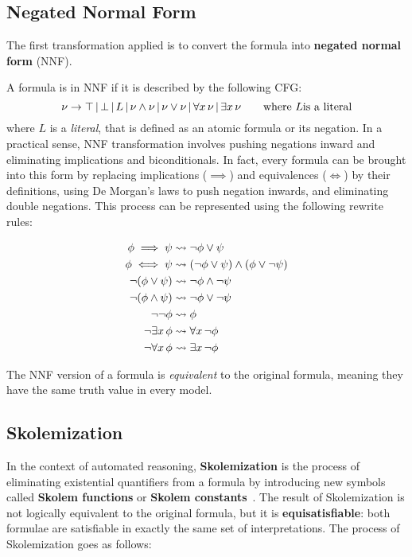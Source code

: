 \subsection{Negated Normal Form}
The first transformation applied is to convert the formula into \textbf{negated normal form} (NNF).

A formula is in NNF if it is described by the following CFG\@:
\begin{equation}
  \nu \to \top  \, | \,  \bot  \, | \,  L  \, | \,  \nu \land \nu  \, | \,  \nu \lor \nu  \, | \,  \forall x  \,  \nu  \, | \,  \exists x  \,  \nu \quad\quad \text{where } L \text{is a literal}
\end{equation}
where \(L\) is a \textit{literal}, that is defined as an atomic formula or its negation.
In a practical sense, NNF transformation involves pushing negations inward and eliminating implications and biconditionals.
In fact, every formula can be brought into this form by replacing implications (\(\implies\)) and equivalences (\(\iff\)) by their definitions, using De Morgan's laws to push negation inwards, and eliminating double negations. This process can be represented using the following rewrite rules:

\begin{equation}
  \begin{aligned}
    \phi \implies \psi &\leadsto \neg \phi \lor \psi \\
    \phi \iff \psi &\leadsto (\neg \phi \lor \psi) \land (\phi \lor \neg \psi) \\
    \neg (\phi \lor \psi) &\leadsto \neg \phi \land \neg \psi \\
    \neg (\phi \land \psi) &\leadsto \neg \phi \lor \neg \psi \\
    \neg \neg \phi &\leadsto \phi \\
    \neg \exists x  \,  \phi &\leadsto \forall x  \,  \neg \phi \\
    \neg \forall x  \,  \phi &\leadsto \exists x  \,  \neg \phi
  \end{aligned}
\end{equation}

The NNF version of a formula is \textit{equivalent} to the original formula, meaning they have the same truth value in every model.

\subsection{Skolemization}
In the context of automated reasoning, \textbf{Skolemization} is the process of eliminating existential quantifiers from a formula by introducing new symbols called \textbf{Skolem functions} or \textbf{Skolem constants}~\cite{skolem1920}.  
The result of Skolemization is not logically equivalent to the original formula, but it is \textbf{equisatisfiable}: both formulae are satisfiable in exactly the same set of interpretations.
The process of Skolemization goes as follows:

